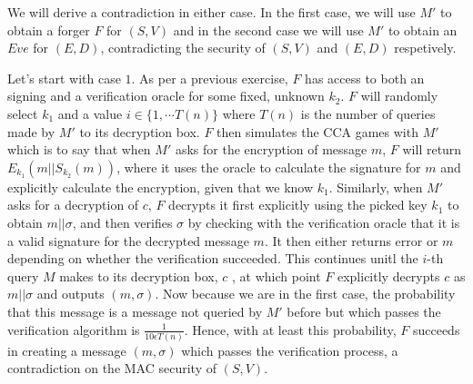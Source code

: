 \documentclass{article}
\begin{document}
\begin{enumerate}[,start=2]
\begin{enumerate}[,label=\alph*.]
\begin{mdbmarginx}{1ex}{0pt}{1ex}{0pt}
\noindent{}We will derive a contradiction in either case. In the first case, we will use $M'$ to obtain
a forger $F$ for $(S,V)$ and in the second case we will use $M'$ to obtain an $Eve$ for $(E,D)$, 
contradicting the security of $(S,V)$ and $(E,D)$ respetively.%

Let's start with case $1$. As per a previous exercise, $F$ has access to both an signing and a 
verification oracle for some fixed, unknown $k_2$. $F$ will randomly select $k_1$ and a value
$i \in \{1, \cdots T(n)\}$ where $T(n)$ is the number of queries made by $M'$ to its decryption box.
$F$ then simulates the CCA games with $M'$ which is to say that when $M'$ asks for the encryption
of message $m$, $F$ will return $E_{k_1}(m || S_{k_2}(m))$, where it uses the oracle to calculate
the signature for $m$ and explicitly calculate the encryption, given that we know $k_1$. 
Similarly, when $M'$ asks for a decryption
of $c$, $F$ decrypts it first explicitly using the picked key $k_1$ to obtain $m || \sigma$,
and then verifies $\sigma$ by checking
with the verification oracle that it is a valid signature for the decrypted message $m$. It then either
returns error or $m$ depending on whether the verification succeeded. 
This continues unitl the $i$-th query $M$ makes to its decryption box, $c$
, at which point $F$ explicitly decrypts $c$ as $m || \sigma$ and outputs $(m,\sigma)$. 
Now because we are in the first case, the probability 
that this message is a message not queried by $M'$ before but which passes the verification 
algorithm is $\frac{1}{10 \epsilon T(n)}$. Hence, with at least this probability, $F$ succeeds in 
creating a message $(m,\sigma)$ which passes the verification process, a contradiction
on the MAC security of $(S,V)$.%


\end{mdbmarginx}
\end{enumerate}
\end{enumerate}
\end{document}
